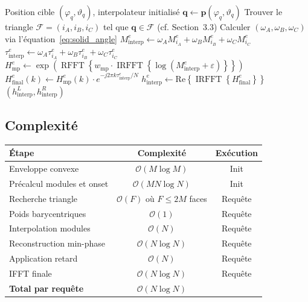 \documentclass[12pt, a4paper]{article}
\theoremstyle{definition}
\newcommand{\vect}[1]{\bm{#1}}
\DeclareMathOperator{\irfft}{IRFFT}
\DeclareMathOperator{\rfft}{RFFT}
\begin{document}
\begin{algorithm}[H]
\caption{Interpolation HRTF à la position $(\varphi_q, \vartheta_q)$}
\begin{algorithmic}[1]
\Require Position cible $(\varphi_q, \vartheta_q)$, interpolateur initialisé
\State $\vect{q} \gets \vect{p}(\varphi_q, \vartheta_q)$
\State Trouver le triangle $\mathcal{F} = (i_A, i_B, i_C)$ tel que
  $\vect{q} \in \mathcal{F}$ (cf. Section~3.3)
\State Calculer $(\omega_A, \omega_B, \omega_C)$ via l'équation~\eqref{eq:solid_angle}
  \State $M_{\mathrm{interp}}^e \gets \omega_A M_{i_A}^e + \omega_B M_{i_B}^e
    + \omega_C M_{i_C}^e$ \Comment{\eqref{eq:interp_magnitude}}
  \State $\tau_{\mathrm{interp}}^e \gets \omega_A\tau_{i_A}^e + \omega_B\tau_{i_B}^e
    + \omega_C\tau_{i_C}^e$ \Comment{\eqref{eq:interp_delay}}
  \State $H_{\mathrm{mp}}^e \gets \exp\!\left(\rfft\!\left\{w_{\mathrm{mp}} \cdot
    \irfft\!\left\{\log(M_{\mathrm{interp}}^e + \varepsilon)\right\}\right\}\right)$
    \Comment{\eqref{eq:step1}}
  \State $H_{\mathrm{final}}^e(k) \gets H_{\mathrm{mp}}^e(k) \cdot
    e^{-j2\pi k\tau_{\mathrm{interp}}^e/N}$ \Comment{\eqref{eq:step2}}
  \State $h_{\mathrm{interp}}^e \gets \mathrm{Re}\!\left\{
    \irfft\!\left\{H_{\mathrm{final}}^e\right\}\right\}$ \Comment{\eqref{eq:step3}}
\EndFor
\State \Return $(h_{\mathrm{interp}}^L, h_{\mathrm{interp}}^R)$
\end{algorithmic}
\end{algorithm}

\subsection{Complexité}

\begin{center}
\begin{tabular}{lcc}
  \toprule
  Étape & Complexité & Exécution \\
  \midrule
  Enveloppe convexe          & $\mathcal{O}(M \log M)$ & Init \\
  Précalcul modules et onset & $\mathcal{O}(MN\log N)$ & Init \\
  Recherche triangle         & $\mathcal{O}(F)$ où $F \leq 2M$ faces & Requête \\
  Poids barycentriques       & $\mathcal{O}(1)$ & Requête \\
  Interpolation modules      & $\mathcal{O}(N)$ & Requête \\
  Reconstruction min-phase   & $\mathcal{O}(N \log N)$ & Requête \\
  Application retard         & $\mathcal{O}(N)$ & Requête \\
  IFFT finale                & $\mathcal{O}(N \log N)$ & Requête \\
  \midrule
  \textbf{Total par requête} & $\mathcal{O}(N \log N)$ & \\
  \bottomrule
\end{tabular}
\end{center}
\end{document}
